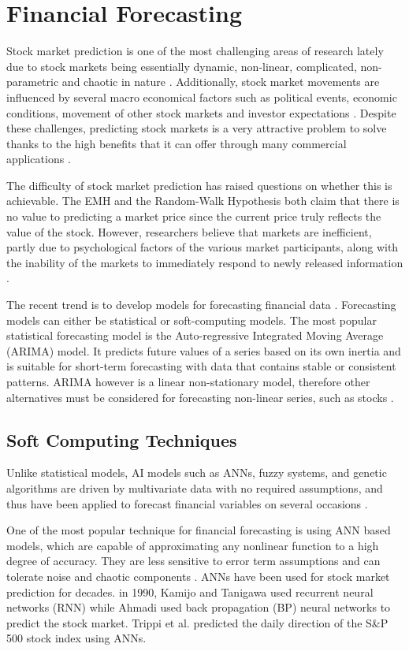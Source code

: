 \documentclass{UoYCSproject}
\begin{document}
\section{Financial Forecasting}
Stock market prediction is one of the most challenging areas of research lately due to stock markets being essentially dynamic, non-linear, complicated, non-parametric and chaotic in nature \cite{tan2005brain}. Additionally, stock market movements are influenced by several macro economical factors such as political events, economic conditions, movement of other stock markets and investor expectations \cite{zhang2009stock}. Despite these challenges, predicting stock markets is a very attractive problem to solve thanks to the high benefits that it can offer through many commercial applications \cite{majhi2007stock}. 

The difficulty of stock market prediction has raised questions on whether this is achievable. The EMH and the Random-Walk Hypothesis both claim that there is no value to predicting a market price since the current price truly reflects the value of the stock. However, researchers believe that markets are inefficient, partly due to psychological factors of the various market participants, along with the inability of the markets to immediately respond to newly released information \cite{jensen1978some}. 

The recent trend is to develop models for forecasting financial data \cite{majhi2007stock}. Forecasting models can either be statistical or soft-computing models. The most popular statistical forecasting model is the Auto-regressive Integrated Moving Average (ARIMA) model. It predicts future values of a series based on its own inertia and is suitable for short-term forecasting with data that contains stable or consistent patterns. ARIMA however is a linear non-stationary model, therefore other alternatives must be considered for forecasting non-linear series, such as stocks \cite{wang1996stock}. 

\subsection{Soft Computing Techniques}
Unlike statistical models, AI models such as ANNs, fuzzy systems, and genetic algorithms are driven by multivariate data with no required assumptions, and thus have been applied to forecast financial variables on several occasions \cite{zhong2017forecasting}. 

One of the most popular technique for financial forecasting is using ANN based models, which are capable of approximating any nonlinear function to a high degree of accuracy. They are less sensitive to error term assumptions and can tolerate noise and chaotic components \cite{majhi2007stock}. ANNs have been used for stock market prediction for decades. in 1990, Kamijo and Tanigawa \cite{kamijo1990stock} used recurrent neural networks (RNN) while Ahmadi \cite{ahmadi1990testability} used back propagation (BP) neural networks to predict the stock market. Trippi et al. \cite{trippi1992trading} predicted the daily direction of the S\&P 500 stock index using ANNs. 
\end{document}
